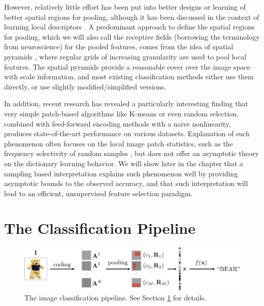 However, relatively little effort has been put into better designs or learning of better spatial regions for pooling, although it has been discussed in the context of learning local descriptors \cite{winder2007learning}. A predominant approach to define the spatial regions for pooling, which we will also call the receptive fields (borrowing the terminology from neuroscience) for the pooled features, comes from the idea of spatial pyramids \cite{lazebnik2006beyond, Yang:2009vb}, where regular grids of increasing granularity are used to pool local features. The spatial pyramids provide a reasonable cover over the image space with scale information, and most existing classification methods either use them directly, or use slightly modified/simplified versions.

In addition, recent research has revealed a particularly interesting finding \cite{coates2010aistats, Rigamonti:2011uc, coates2011icml, saxe2011random} that very simple patch-based algorithms like K-means or even random selection, combined with feed-forward encoding methods with a naive nonlinearity, produces state-of-the-art performance on various datasets. Explanation of such phenomenon often focuses on the local image patch statistics, such as the frequency selectivity of random samples \cite{saxe2011random}, but does not offer an asymptotic theory on the dictionary learning behavior. We will show later in the chapter that a \nystrom sampling based interpretation explains such phenomenon well by providing asymptotic bounds to the observed accuracy, and that such interpretation will lead to an efficient, unsupervised feature selection paradigm.

\section{The Classification Pipeline}\label{sec:pipeline}

\begin{figure}[t]
  \centering
  \includegraphics[width=1.\textwidth]{figs/smartpooling/pipeline_cvpr.pdf}
  \caption{The image classification pipeline. See Section \ref{sec:pipeline} for details.}\label{fig:pipeline}
  \vspace{-0.15in}
\end{figure}

